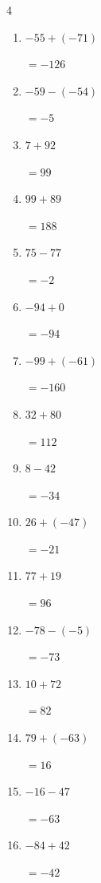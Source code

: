 \begin{multicols}{4}
\begin{enumerate}
        $=-3$

\columnbreak %

\resetques

  \item $-55+(-71)$

        $=-126$

  \item $-59-(-54)$

        $=-5$

  \item $7+92$

        $=99$

  \item $99+89$

        $=188$

  \item $75-77$

        $=-2$

  \item $-94+0$

        $=-94$

  \item $-99+(-61)$

        $=-160$

  \item $32+80$

        $=112$

  \item $8-42$

        $=-34$

  \item $26+(-47)$

        $=-21$

  \item $77+19$

        $=96$

  \item $-78-(-5)$

        $=-73$

  \item $10+72$

        $=82$

  \item $79+(-63)$

        $=16$

  \item $-16-47$

        $=-63$

  \item $-84+42$

        $=-42$


\end{enumerate}
\end{multicols}

